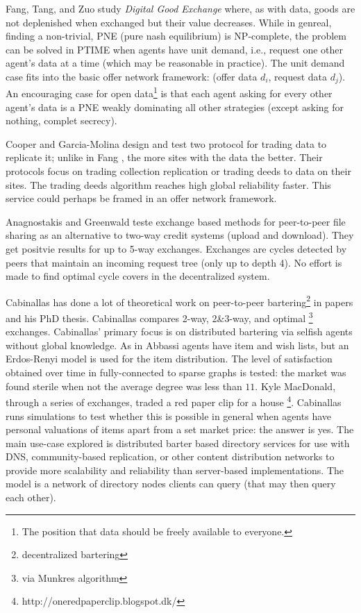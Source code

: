 \documentclass[main.tex]{subfiles}
\begin{document}
Fang, Tang, and Zuo study \textit{Digital Good Exchange} \cite{Fang} where, as with data, goods are not deplenished when exchanged but their value decreases. While in genreal, finding a non-trivial, PNE (pure nash equilibrium) is NP-complete, the problem can be solved in PTIME when agents have unit demand, i.e., request one other agent's data at a time (which may be reasonable in practice). The unit demand case fits into the basic offer network framework: (offer data $d_i$, request data $d_j$). An encouraging case for open data\footnote{The position that data should be freely available to everyone.} is that each agent asking for every other agent's data is a PNE weakly dominating all other strategies (except asking for nothing, complet secrecy).

Cooper and Garcia-Molina \cite{Coo1} design and test two protocol for trading data to replicate it; unlike in Fang \cite{Fang}, the more sites with the data the better. Their protocols focus on trading collection replication or trading deeds to data on their sites. The trading deeds algorithm reaches high global reliability faster. This service could perhaps be framed in an offer network framework.

Anagnostakis and Greenwald \cite{Ana1} teste exchange based methods for peer-to-peer file sharing as an alternative to two-way credit systems (upload and download). They get positvie results for up to 5-way exchanges. Exchanges are cycles detected by peers that maintain an incoming request tree (only up to depth 4). No effort is made to find optimal cycle covers in the decentralized system.

Cabinallas \cite{Cab0} \cite{Cab1} has done a lot of theoretical work on peer-to-peer bartering\footnote{decentralized bartering} in papers and his PhD thesis. Cabinallas compares 2-way, 2\&3-way, and optimal \footnote{via Munkres algorithm} exchanges. Cabinallas' primary focus is on distributed bartering via selfish agents without global knowledge. As in Abbassi \cite{Abb1} \cite{Abb2} agents have item and wish lists, but an Erdos-Renyi model is used for the item distribution. The level of satisfaction obtained over time in fully-connected to sparse graphs is tested: the market was found sterile when not the average degree was less than $11$. Kyle MacDonald, through a series of exchanges, traded a red paper clip for a house \footnote{http://oneredpaperclip.blogspot.dk/}. Cabinallas runs simulations to test whether this is possible in general when agents have personal valuations of items apart from a set market price: the answer is yes. The main use-case explored is distributed barter based directory services for use with DNS, community-based replication, or other content distribution networks to provide more scalability and reliability than server-based implementations. The model is a network of directory nodes clients can query (that may then query each other).
\end{document}
